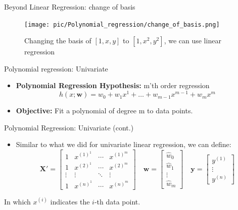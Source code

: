 \documentclass[serif, aspectratio=169]{beamer}
\begin{document}
\begin{frame}{Beyond Linear Regression: change of basis}
    \begin{figure}[h]
    \centering
    \texttt{[image: pic/Polynomial\_regression/change\_of\_basis.png]}
    \caption{Changing the basis of \( [1, x, y] \) to \( [1, x^2, y^2] \), we can use linear regression}
    \end{figure}
\end{frame}

\begin{frame}{Polynomial regression: Univariate}
    \begin{itemize}
        \item \textbf{Polynomial Regression Hypothesis:} m'th order regression
        \[
        h(x; \mathbf{w}) = w_0 + w_1 x^1 + \dots + w_{m-1} x^{m-1} + w_m x^m
        \]
        \item \textbf{Objective:} Fit a polynomial of degree m to data points.
    \end{itemize}
\end{frame}

\begin{frame}{Polynomial Regression: Univariate (cont.)}
    \begin{itemize}
        \item Similar to what we did for univariate linear regression, we can define:
        \[
        \mathbf{X'} =
        \begin{bmatrix}
        1 & x^{(1)^1} & \cdots & x^{(1)^m} \\
        1 & x^{(2)^1} & \cdots & x^{(2)^m} \\
        \vdots & \vdots & \ddots & \vdots \\
        1 & x^{(n)^1} & \cdots & x^{(n)^m}
        \end{bmatrix}
        \quad
        \mathbf{w} =
        \begin{bmatrix}
        \hat{w}_0 \\
        \hat{w}_1 \\
        \vdots \\
        \hat{w}_m
        \end{bmatrix}
        \quad
        \mathbf{y} =
        \begin{bmatrix}
        y^{(1)} \\
        \vdots \\
        y^{(n)}
        \end{bmatrix}
        \]
    \end{itemize}
    \begin{center}
        In which \( x^{(i)} \) indicates the \( i \)-th data point.
    \end{center}
\end{frame}
\end{document}
